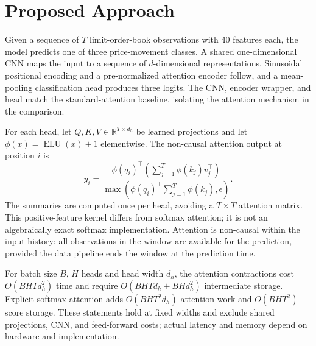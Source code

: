 \section{Proposed Approach}
Given a sequence of $T$ limit-order-book observations with 40 features each, the model predicts one of three price-movement classes. A shared one-dimensional CNN maps the input to a sequence of $d$-dimensional representations. Sinusoidal positional encoding and a pre-normalized attention encoder follow, and a mean-pooling classification head produces three logits. The CNN, encoder wrapper, and head match the standard-attention baseline, isolating the attention mechanism in the comparison.

For each head, let $Q,K,V\in\mathbb{R}^{T\times d_h}$ be learned projections and let $\phi(x)=\operatorname{ELU}(x)+1$ elementwise. The non-causal attention output at position $i$ is
\begin{equation}
 y_i=\frac{\phi(q_i)^\top\left(\sum_{j=1}^{T}\phi(k_j)v_j^\top\right)}{\max\left(\phi(q_i)^\top\sum_{j=1}^{T}\phi(k_j),\epsilon\right)}.
\end{equation}
The summaries are computed once per head, avoiding a $T\times T$ attention matrix. This positive-feature kernel differs from softmax attention; it is not an algebraically exact softmax implementation. Attention is non-causal within the input history: all observations in the window are available for the prediction, provided the data pipeline ends the window at the prediction time.

For batch size $B$, $H$ heads and head width $d_h$, the attention contractions cost $O(BHTd_h^2)$ time and require $O(BHTd_h + BHd_h^2)$ intermediate storage. Explicit softmax attention adds $O(BHT^2d_h)$ attention work and $O(BHT^2)$ score storage. These statements hold at fixed widths and exclude shared projections, CNN, and feed-forward costs; actual latency and memory depend on hardware and implementation.
